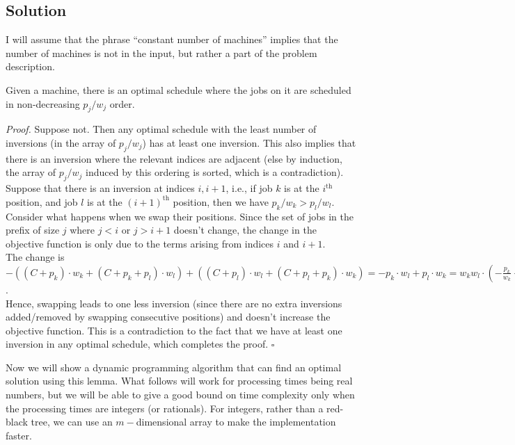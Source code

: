 \documentclass[a4paper]{article}
\newenvironment{proof}{\begin{breakbox}\textit{Proof.}}{\hfill$\square$\end{breakbox}}
\newcommand{\nl}{\vspace{0.2cm}\\}
\begin{document}
\subsection{Solution}
I will assume that the phrase ``constant number of machines'' implies that the number of machines is not in the input, but rather a part of the problem description.\nl
\begin{claim}
    Given a machine, there is an optimal schedule where the jobs on it are scheduled in non-decreasing $p_j / w_j$ order.
\end{claim}
\begin{proof}
    Suppose not. Then any optimal schedule with the least number of inversions (in the array of $p_j / w_j$) has at least one inversion. This also implies that there is an inversion where the
    relevant indices are adjacent (else by induction, the array of $p_j / w_j$ induced by this ordering is sorted, which is a contradiction).\nl
    Suppose that there is an inversion at indices $i, i + 1$, i.e., if job $k$ is at the $i^\mathrm{th}$ position, and job $l$ is at the $(i + 1)^\mathrm{th}$ position, then we have $p_k / w_k > p_l
    / w_l$.
    Consider what happens when we swap their positions. Since the set of jobs in the prefix of size $j$ where $j < i$ or $j > i + 1$ doesn't change, the change in the objective function is only
    due to the terms arising from indices $i$ and $i + 1$.\nl
    The change is $-((C + p_k) \cdot w_k + (C + p_k + p_l) \cdot w_l) + ((C + p_l) \cdot w_l + (C + p_l + p_k) \cdot w_k) = - p_k \cdot w_l + p_l \cdot w_k = w_k w_l \cdot \left(-\frac{p_k}{w_k}
        +\frac{p_l}{w_l}\right) \le 0$.\nl
        Hence, swapping leads to one less inversion (since there are no extra inversions added/removed by swapping consecutive positions) and doesn't increase the objective function. This is
        a contradiction to the fact that we have at least one inversion in any optimal schedule, which completes the proof.
\end{proof}
Now we will show a dynamic programming algorithm that can find an optimal solution using this lemma. What follows will work for processing times being real numbers, but we will be able to give a
good bound on time complexity only when the processing times are integers (or rationals). For integers, rather than a red-black tree, we can use an $m-$dimensional array to make the
implementation faster.
\end{document}
